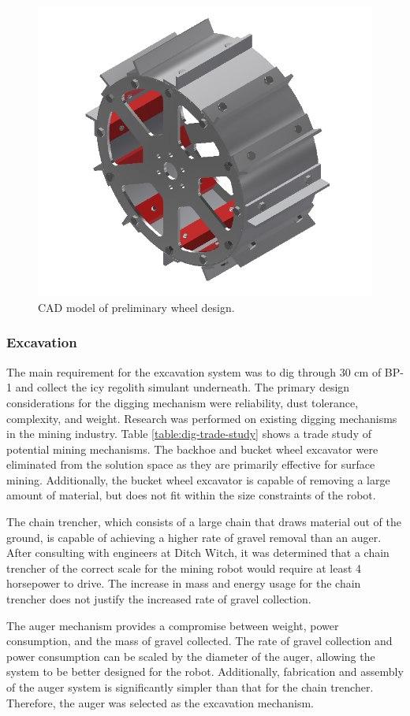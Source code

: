 \documentclass[class=article, crop=false]{standalone}
\begin{document}
	\FloatBarrier
		\begin{figure}[h]
			\centering
			\includegraphics[width=0.4\linewidth]{09_Figures/wheel-cad-preliminary.jpg}
			\caption{CAD model of preliminary wheel design.}
			\label{fig:cad-wheel-prelim}
		\end{figure}
		\FloatBarrier

	\subsubsection{Excavation}
	The main requirement for the excavation system was to dig through 30 cm of BP-1 and collect the icy regolith simulant underneath. The primary design considerations for the digging mechanism were reliability, dust tolerance, complexity, and weight. 
Research was performed on existing digging mechanisms in the mining industry. Table \ref{table:dig-trade-study} shows a trade study of potential mining mechanisms. The backhoe and bucket wheel excavator were eliminated from the solution space as they are primarily effective for surface mining. Additionally, the bucket wheel excavator is capable of removing a large amount of material, but does not fit within the size constraints of the robot.

The chain trencher, which consists of a large chain that draws material out of the ground, is capable of achieving a higher rate of gravel removal than an auger. After consulting with engineers at Ditch Witch, it was determined that a chain trencher of the correct scale for the mining robot would require at least 4 horsepower to drive. The increase in mass and energy usage for the chain trencher does not justify the increased rate of gravel collection.

The auger mechanism provides a compromise between weight, power consumption, and the mass of gravel collected. The rate of gravel collection and power consumption can be scaled by the diameter of the auger, allowing the system to be better designed for the robot. Additionally, fabrication and assembly of the auger system is significantly simpler than that for the chain trencher. Therefore, the auger was selected as the excavation mechanism.
\end{document}
